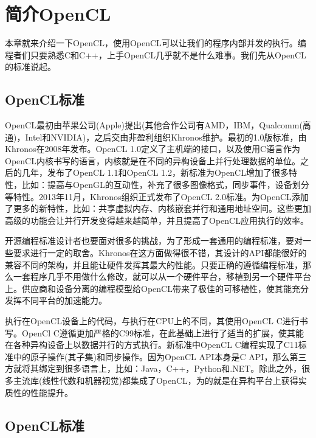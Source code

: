 

\section{简介OpenCL}

本章就来介绍一下OpenCL，使用OpenCL可以让我们的程序内部并发的执行。编程者们只要熟悉C和C++，上手OpenCL几乎就不是什么难事。我们先从OpenCL的标准说起。

\subsection{OpenCL标准}

OpenCL最初由苹果公司(Apple)提出(其他合作公司有AMD，IBM，Qualcomm(高通)，Intel和NVIDIA)，之后交由非盈利组织Khronos维护。最初的1.0版标准，由Khronos在2008年发布。OpenCL 1.0定义了主机端的接口，以及使用C语言作为OpenCL内核书写的语言，内核就是在不同的异构设备上并行处理数据的单位。之后的几年，发布了OpenCL 1.1和OpenCL 1.2，新标准为OpenCL增加了很多特性，比如：提高与OpenGL的互动性，补充了很多图像格式，同步事件，设备划分等特性。2013年11月，Khronos组织正式发布了OpenCL 2.0标准。为OpenCL添加了更多的新特性，比如：共享虚拟内存、内核嵌套并行和通用地址空间。这些更加高级的功能会让并行开发变得越来越简单，并且提高了OpenCL应用执行的效率。

开源编程标准设计者也要面对很多的挑战，为了形成一套通用的编程标准，要对一些要求进行一定的取舍。Khronos在这方面做得很不错，其设计的API都能很好的兼容不同的架构，并且能让硬件发挥其最大的性能。只要正确的遵循编程标准，那么一套程序几乎不用做什么修改，就可以从一个硬件平台，移植到另一个硬件平台上。供应商和设备分离的编程模型给OpenCL带来了极佳的可移植性，使其能充分发挥不同平台的加速能力。

执行在OpenCL设备上的代码，与执行在CPU上的不同，其使用OpenCL C进行书写。OpenCl C遵循更加严格的C99标准，在此基础上进行了适当的扩展，使其能在各种异构设备上以数据并行的方式执行。新标准中OpenCL C编程实现了C11标准中的原子操作(其子集)和同步操作。因为OpenCL API本身是C API，那么第三方就将其绑定到很多语言上，比如：Java，C++，Python和.NET。除此之外，很多主流库(线性代数和机器视觉)都集成了OpenCL，为的就是在异构平台上获得实质性的性能提升。

\subsection{OpenCL标准}

